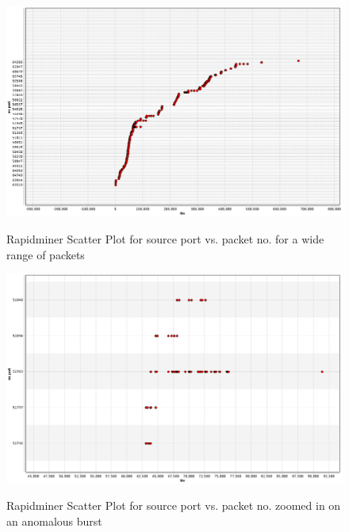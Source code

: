 \documentclass{article}
\begin{document}
\begin{figure}[H] 
	\centering %
	{\includegraphics[width=\textwidth]{images/ex2_scatter_src_no_49_2_wide.png}} %
	\caption{Rapidminer Scatter Plot for source port vs. packet no. for a wide range of packets} 
	\label{fig:RMscreen2} %
\end{figure} 
\begin{figure}[H] 
	\centering %
	{\includegraphics[width=\textwidth]{images/ex2_scatter_src_no_49_2_tight.png}} %
	\caption{Rapidminer Scatter Plot for source port vs. packet no. zoomed in on an anomalous burst} 
	\label{fig:RMscreen3} %
\end{figure} 


\newpage
\end{document}
